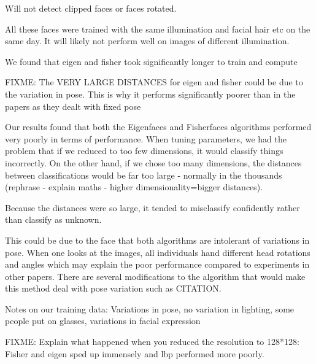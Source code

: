 \documentclass{article}
\begin{document}
Will not detect clipped faces or faces rotated.

All these faces were trained with the same illumination and facial hair etc on the same day. It will likely not perform well on images of different illumination.

We found that eigen and fisher took significantly longer to train and compute

FIXME: The VERY LARGE DISTANCES for eigen and fisher could be due to the variation in pose. This is why it performs significantly poorer than in the papers as they dealt with fixed pose

Our results found that both the Eigenfaces and Fisherfaces algorithms performed very poorly in terms of performance. When tuning parameters, we had the problem that if we reduced to too few dimensions, it would classify things incorrectly. On the other hand, if we chose too many dimensions, the distances between classifications would be far too large - normally in the thousands (rephrase - explain maths - higher dimensionality=bigger distances).

Because the distances were so large, it tended to misclassify confidently rather than classify as unknown.

This could be due to the face that both algorithms are intolerant of variations in pose. When one looks at the images, all individuals hand different head rotations and angles which may explain the poor performance compared to experiments in other papers\cite{belhumeur1997eigenfaces}. There are several modifications to the algorithm that would make this method deal with pose variation such as CITATION.

Notes on our training data: Variations in pose, no variation in lighting, some people put on glasses, variations in facial expression

FIXME: Explain what happened when you reduced the resolution to 128*128: Fisher and eigen sped up immensely and lbp performed more poorly.

\nocite{*} %


\end{document}
